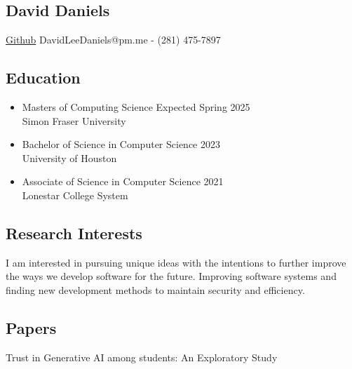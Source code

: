 \documentclass[12pt]{article}
\begin{document}
    \begin{center}
        \section*{David Daniels}
        \cite{github}\href{https://github.com/tetricz}{Github} DavidLeeDaniels@pm.me - (281) 475-7897
    \end{center}

    \subsection*{Education}
    \begin{itemize}[leftmargin=0em]
        \item[] Masters of Computing Science \hfill Expected Spring 2025 \\
        Simon Fraser University
        \item[] Bachelor of Science in Computer Science \hfill 2023 \\
        University of Houston
        \item[] Associate of Science in Computer Science \hfill 2021 \\
        Lonestar College System
    \end{itemize}

    \subsection*{Research Interests}
    I am interested in pursuing unique ideas with the intentions to further improve the ways we 
    develop software for the future. Improving software systems and finding new development 
    methods to maintain security and efficiency.

    \subsection*{Papers}

    \cite{Amoozadeh_2023} Trust in Generative AI among students: An Exploratory Study
    
\end{document}
